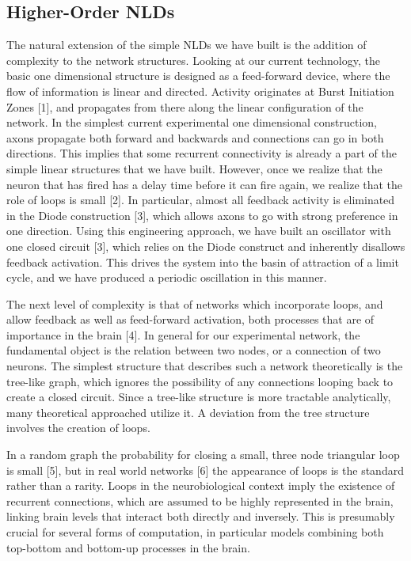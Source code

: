 \subsection{Higher-Order NLDs}
The natural extension of the simple NLDs we have built is the addition of complexity to the network structures. Looking at our current technology, the basic one dimensional structure is designed as a feed-forward device, where the flow of information is linear and directed. Activity originates at Burst Initiation Zones [1], and propagates from there along the linear configuration of the network. In the simplest current experimental one dimensional construction, axons propagate both forward and backwards and connections can go in both directions. This implies that some recurrent connectivity is already a part of the simple linear structures that we have built. However, once we realize that the neuron that has fired has a delay time before it can fire again, we realize that the role of loops is small [2]. In particular, almost all feedback activity is eliminated in the Diode construction [3], which allows axons to go with strong preference in one direction. Using this engineering approach, we have built an oscillator with one closed circuit [3], which relies on the Diode construct and inherently disallows feedback activation. This drives the system into the basin of attraction of a limit cycle, and we have produced a periodic oscillation in this manner.

The next level of complexity is that of networks which incorporate loops, and allow feedback as well as feed-forward activation, both processes that are of importance in the brain [4]. In general for our experimental network, the fundamental object is the relation between two nodes, or a connection of two neurons. The simplest structure that describes such a network theoretically is the tree-like graph, which ignores the possibility of any connections looping back to create a closed circuit. Since a tree-like structure is more tractable analytically, many theoretical approached utilize it. A deviation from the tree structure involves the creation of loops.

In a random graph the probability for closing a small, three node triangular loop is small [5], but in real world networks [6] the appearance of loops is the standard rather than a rarity. Loops in the neurobiological context imply the existence of recurrent connections, which are assumed to be highly represented in the brain, linking brain levels that interact both directly and inversely. This is presumably crucial for several forms of computation, in particular models combining both top-bottom and bottom-up processes in the brain. 

